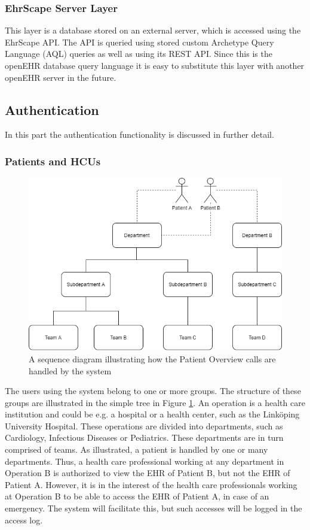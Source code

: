 \documentclass{article}
\begin{document}
\subsubsection{EhrScape Server Layer}
This layer is a database stored on an external server, which is accessed using the EhrScape API. The API is queried using stored custom Archetype Query Language (AQL) queries as well as using its REST API. Since this is the openEHR database query language it is easy to substitute this layer with another openEHR server in the future.

\clearpage
\subsection{Authentication} \label{Authentication}
In this part the authentication functionality is discussed in further detail.

\subsubsection{Patients and HCUs}
\begin{figure}[h]
    \centering
    \includegraphics[scale = 0.45]{departments}
    \caption{A sequence diagram illustrating how the Patient Overview calls are handled by the system}
    \label{fig:departments}
\end{figure}

The users using the system belong to one or more groups. The structure of these groups are illustrated in the simple tree in Figure \ref{fig:departments}. An operation is a health care institution and could be e.g. a hospital or a health center, such as the Linköping University Hospital. These operations are divided into departments, such as Cardiology,  Infectious Diseases or Pediatrics. These departments are in turn comprised of teams.  
As illustrated, a patient is handled by one or many departments. Thus, a health care professional working at any department in Operation B is authorized to view the EHR of Patient B, but not the EHR of Patient A.
However, it is in the interest of the health care professionals working at Operation B to be able to access the EHR of Patient A, in case of an emergency. The system will facilitate this, but such accesses will be logged in the access log.
\end{document}
